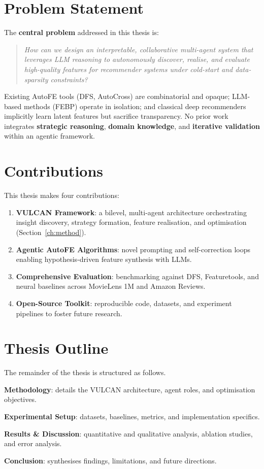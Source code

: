 \section{Problem Statement}
The \textbf{central problem} addressed in this thesis is:
\blockquote{\itshape
How can we design an \emph{interpretable}, \emph{collaborative} multi-agent system that leverages LLM reasoning to autonomously discover, realise, and evaluate high-quality features for recommender systems under cold-start and data-sparsity constraints?}

Existing AutoFE tools (DFS, AutoCross) are combinatorial and opaque; LLM-based methods (FEBP) operate in isolation; and classical deep recommenders implicitly learn latent features but sacrifice transparency.  No prior work integrates \textbf{strategic reasoning}, \textbf{domain knowledge}, and \textbf{iterative validation} within an agentic framework.

\section{Contributions}
This thesis makes four contributions:
\begin{enumerate}[leftmargin=*]
  \item \textbf{VULCAN Framework}: a bilevel, multi-agent architecture orchestrating insight discovery, strategy formation, feature realisation, and optimisation (Section~\ref{ch:method}).
  \item \textbf{Agentic AutoFE Algorithms}: novel prompting and self-correction loops enabling hypothesis-driven feature synthesis with LLMs.
  \item \textbf{Comprehensive Evaluation}: benchmarking against DFS, Featuretools, and neural baselines across MovieLens 1M and Amazon Reviews.
  \item \textbf{Open-Source Toolkit}: reproducible code, datasets, and experiment pipelines to foster future research.
\end{enumerate}

\section{Thesis Outline}
The remainder of the thesis is structured as follows.
\begin{description}[leftmargin=2.5em,labelindent=0pt]
  \item[Chapter~2] \textbf{Methodology}: details the VULCAN architecture, agent roles, and optimisation objectives.
  \item[Chapter~3] \textbf{Experimental Setup}: datasets, baselines, metrics, and implementation specifics.
  \item[Chapter~4] \textbf{Results \& Discussion}: quantitative and qualitative analysis, ablation studies, and error analysis.
  \item[Chapter~5] \textbf{Conclusion}: synthesises findings, limitations, and future directions.
\end{description}

